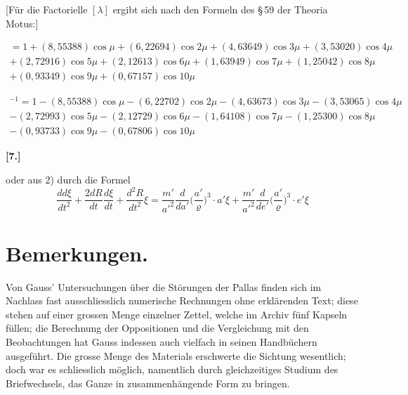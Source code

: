 \documentclass[10pt,a4paper]{article}
\begin{document}
[F\"ur die Factorielle $[\lambda]$ ergibt sich nach den Formeln des \S\,59 der Theoria Motus:]

\begin{multline*}
[\lambda] = 1 + (8{,}55388)\cos\mu + (6{,}22694)\cos 2\mu + (4{,}63649)\cos 3\mu + (3{,}53020)\cos 4\mu \\
+ (2{,}72916)\cos 5\mu + (2{,}12613)\cos 6\mu + (1{,}63949)\cos 7\mu + (1{,}25042)\cos 8\mu \\
+ (0{,}93349)\cos 9\mu + (0{,}67157)\cos 10\mu
\end{multline*}

\newpage
{}

\begin{multline*}
[\lambda]^{-1} = 1 - (8{,}55388)\cos\mu - (6{,}22702)\cos 2\mu - (4{,}63673)\cos 3\mu - (3{,}53065)\cos 4\mu \\
- (2{,}72993)\cos 5\mu - (2{,}12729)\cos 6\mu - (1{,}64108)\cos 7\mu - (1{,}25300)\cos 8\mu \\
- (0{,}93733)\cos 9\mu - (0{,}67806)\cos 10\mu
\end{multline*}

\medskip
\noindent\textbf{[7.]}

\medskip
{}

\newpage
\noindent
oder aus 2) durch die Formel
\begin{equation*}
\frac{dd\xi}{dt^2} + \frac{2dR}{dt}\frac{d\xi}{dt} + \frac{d^2R}{dt^2}\xi = \frac{m'}{a'^2}\frac{d}{da'}\biggl(\frac{a'}{\varrho}\biggr)^3\cdot a'\xi + \frac{m'}{a'^2}\frac{d}{de'}\biggl(\frac{a'}{\varrho}\biggr)^3\cdot e'\xi
\end{equation*}


\newpage
\section*{Bemerkungen.}

Von Gauss' Untersuchungen \"uber die St\"orungen der Pallas finden sich im Nachlass fast ausschliesslich numerische Rechnungen ohne erkl\"arenden Text; diese stehen auf einer grossen Menge einzelner Zettel, welche im Archiv f\"unf Kapseln f\"ullen; die Berechnung der Oppositionen und die Vergleichung mit den Beobachtungen hat Gauss indessen auch vielfach in seinen Handb\"uchern ausgef\"uhrt. Die grosse Menge des Materials erschwerte die Sichtung wesentlich; doch war es schliesslich m\"oglich, namentlich durch gleichzeitiges Studium des Briefwechsels, das Ganze in zusammenh\"angende Form zu bringen.
\end{document}
